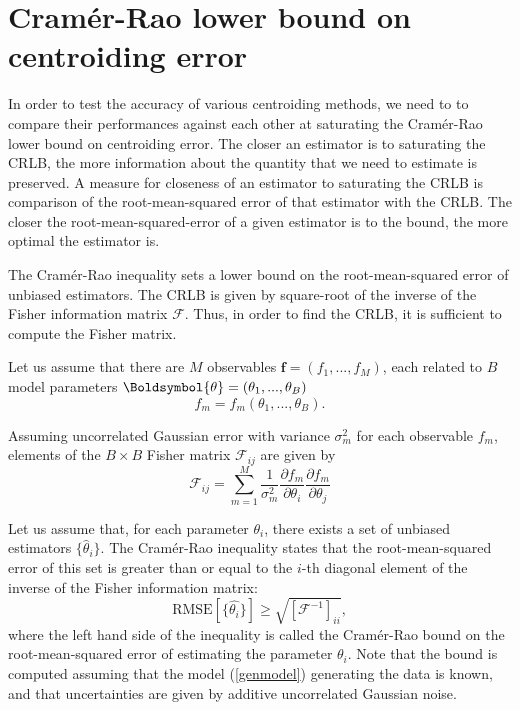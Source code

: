 \documentclass[12pt, preprint]{aastex}
\newcommand{\beq}{\begin{equation}}
\newcommand{\eeq}{\end{equation}}
\begin{document}
\section{Cram\'{e}r-Rao lower bound on centroiding error}\label{sec:CRLB}

In order to test the accuracy of various centroiding methods, we need to to compare their 
performances against each other at saturating the Cram\'{e}r-Rao lower bound on centroiding error. 
The closer an estimator is to saturating the CRLB, the more information about the quantity that we 
need to estimate is preserved. A measure for closeness of an estimator to 
saturating the CRLB is comparison of the root-mean-squared error of that estimator 
with the CRLB. The closer the root-mean-squared-error of a given estimator is to the bound, 
the more optimal the estimator is. 

The Cram\'{e}r-Rao inequality \citep{cramer} sets a lower bound on the 
root-mean-squared error of unbiased estimators. The CRLB is given by square-root of the inverse of 
the Fisher information matrix $\mathcal{F}$. Thus, in order to find the CRLB,
 it is sufficient to compute the Fisher matrix. 

Let us assume that there are $M$ observables $\mathbf{f} = (f_{1}, ... , f_{M})$, each
related to $B$ model parameters $\Boldsymbol{\mathbf{\theta}} = (\theta_{1} , ... , \theta_{B})$ 
\beq
f_{m} = f_{m}(\theta_{1} , ... , \theta_{B}).
\label{genmodel}
\eeq

Assuming uncorrelated Gaussian error with variance $\sigma^{2}_{m}$ for each observable $f_{m}$, elements
of the $B\times B$ Fisher matrix $\mathcal{F}_{ij}$ are given by
\beq
\mathcal{F}_{ij} = \sum_{m=1}^{M}\frac{1}{\sigma_{m}^{2}}\frac{\partial f_{m}}{\partial \theta_{i}}\frac{\partial f_{m}}{\partial \theta_{j}}
\label{fisher}
\eeq

Let us assume that, for each parameter $\theta_{i}$, there exists a set of 
unbiased estimators $\{\hat{\theta}_{i}\}$. The Cram\'{e}r-Rao inequality 
states that the root-mean-squared error of this set is greater than or equal to 
the $i$-th diagonal element of the inverse of the Fisher information matrix:
\beq
\text{RMSE}[\{\hat{\theta_{i}}\}] \geq \sqrt{[\mathcal{F}^{-1}]_{ii}},
\label{inequality}
\eeq
where the left hand side of the inequality is called the Cram\'{e}r-Rao bound on 
the root-mean-squared error of estimating the parameter $\theta_{i}$. Note that 
the bound is computed assuming that the model (\ref{genmodel}) generating the data 
is known, and that uncertainties are given by additive uncorrelated Gaussian noise.
\end{document}

